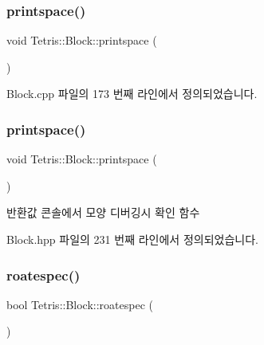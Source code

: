 \mbox{\label{class_tetris_1_1_block_ae7aadeec449fec232e9635d839593028}} 
\subsubsection{\texorpdfstring{printspace()}{printspace()}\hspace{0.1cm}{\footnotesize\ttfamily [1/2]}}
{\footnotesize\ttfamily void Tetris\+::\+Block\+::printspace (\begin{DoxyParamCaption}{ }\end{DoxyParamCaption})}



Block.\+cpp 파일의 173 번째 라인에서 정의되었습니다.

\mbox{\label{class_tetris_1_1_block_ae7aadeec449fec232e9635d839593028}} 
\subsubsection{\texorpdfstring{printspace()}{printspace()}\hspace{0.1cm}{\footnotesize\ttfamily [2/2]}}
{\footnotesize\ttfamily void Tetris\+::\+Block\+::printspace (\begin{DoxyParamCaption}{ }\end{DoxyParamCaption})\hspace{0.3cm}{\ttfamily [inline]}}

\begin{DoxyReturn}{반환값}
콘솔에서 모양 디버깅시 확인 함수 
\end{DoxyReturn}


Block.\+hpp 파일의 231 번째 라인에서 정의되었습니다.

\mbox{\label{class_tetris_1_1_block_a787424e5e9ec2807989121e8dcee1a7a}} 
\subsubsection{\texorpdfstring{roatespec()}{roatespec()}\hspace{0.1cm}{\footnotesize\ttfamily [1/2]}}
{\footnotesize\ttfamily bool Tetris\+::\+Block\+::roatespec (\begin{DoxyParamCaption}{ }\end{DoxyParamCaption})}



